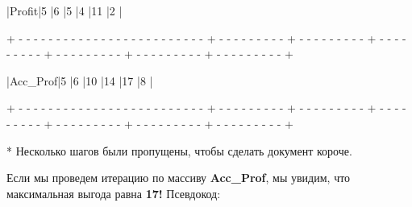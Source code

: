 \begin{tcolorbox}
\hspace{0.4mm}|\hspace{17.6mm}Profit\hspace{17.6mm}|\hspace{7.1mm}5\hspace{7.1mm} |\hspace{7.1mm}6\hspace{7.1mm} |\hspace{7.1mm}5\hspace{7.1mm} |\hspace{7.1mm}4\hspace{7.1mm} |\hspace{5.8mm}11\hspace{5.8mm} |\hspace{7.1mm}2\hspace{7.1mm} |

{\tiny{+ - - - - - - - - - - - - - - - - - - - - - - - - - + - - - - - - - - - + - - - - - - - - - + - - - - - - - - - + - - - - - - - - - + - - - - - - - - - + - - - - - - - - - +}}

\hspace{0.4mm}|\hspace{14mm}Acc\_Prof\hspace{14mm}|\hspace{7.1mm}5\hspace{7.1mm} |\hspace{7.1mm}6\hspace{7.1mm} |\hspace{6mm}10\hspace{6mm} |\hspace{6mm}14\hspace{6mm} |\hspace{5.8mm}17\hspace{5.8mm} |\hspace{7.1mm}8\hspace{7.1mm} |

{\tiny{+ - - - - - - - - - - - - - - - - - - - - - - - - - + - - - - - - - - - + - - - - - - - - - + - - - - - - - - - + - - - - - - - - - + - - - - - - - - - + - - - - - - - - - +}}
\end{tcolorbox}

\vspace{\baselineskip}
* Несколько шагов были пропущены, чтобы сделать документ короче. 

\vspace{\baselineskip}
Если мы проведем итерацию по массиву \textbf{Acc\_Prof}, мы увидим, что максимальная выгода равна \textbf{17!} Псевдокод: 

